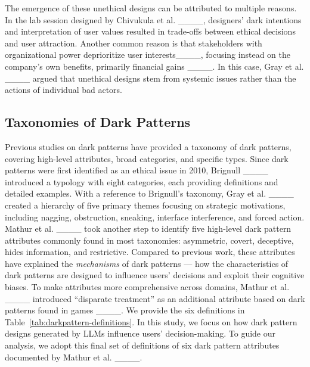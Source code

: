The emergence of these unethical designs can be attributed to multiple reasons. In the lab session designed by Chivukula et al. ____, designers' dark intentions and interpretation of user values resulted in trade-offs between ethical decisions and user attraction. Another common reason is that stakeholders with organizational power deprioritize user interests____, focusing instead on the company's own benefits, primarily financial gains ____. In this case, Gray et al. ____ argued that unethical designs stem from systemic issues rather than the actions of individual bad actors.

\subsection{Taxonomies of Dark Patterns}

Previous studies on dark patterns have provided a taxonomy of dark patterns, covering high-level attributes, broad categories, and specific types. Since dark patterns were first identified as an ethical issue in 2010, Brignull ____ introduced a typology with eight categories, each providing definitions and detailed examples. With a reference to Brignull's taxonomy, Gray et al. ____ created a hierarchy of five primary themes focusing on strategic motivations, including nagging, obstruction, sneaking, interface interference, and forced action. Mathur et al. ____ took another step to identify five high-level dark pattern attributes commonly found in most taxonomies: asymmetric, covert, deceptive, hides information, and restrictive. Compared to previous work, these attributes have explained the \textit{mechanisms} of dark patterns --- how the characteristics of dark patterns are designed to influence users' decisions and exploit their cognitive biases. To make attributes more comprehensive across domains, Mathur et al. ____ introduced ``disparate treatment'' as an additional attribute based on dark patterns found in games ____. We provide the six definitions in Table~\ref{tab:darkpattern-definitions}. %
In this study, we focus on how dark pattern designs generated by LLMs influence users' decision-making. To guide our analysis, we adopt this final set of definitions of six dark pattern attributes documented by Mathur et al. ____.